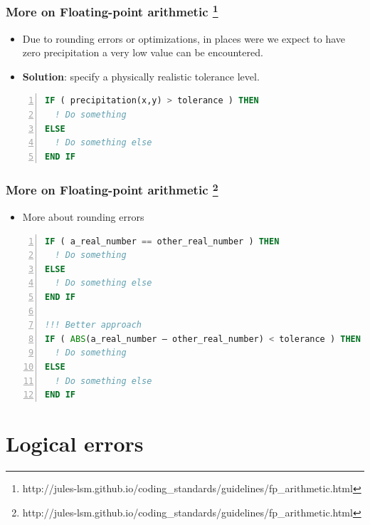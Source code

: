 \documentclass[t]{myBeamer}
\begin{document}
\begin{frame}[fragile,t]
\frametitle{ More on Floating-point arithmetic
\footnote{http://jules-lsm.github.io/coding\_standards/guidelines/fp\_arithmetic.html}}
\large

\begin{itemize}
  \item Due to rounding errors or optimizations, in places were we expect to have zero precipitation a very low value can be encountered. 
 \item \textbf{Solution}: specify a physically realistic tolerance level.
\end{itemize}

\begin{lstlisting}[language=fortran,numbers=left]
IF ( precipitation(x,y) > tolerance ) THEN
  ! Do something
ELSE
  ! Do something else
END IF
\end{lstlisting}

\end{frame}


\begin{frame}[fragile,t]
\frametitle{ More on Floating-point arithmetic
\footnote{http://jules-lsm.github.io/coding\_standards/guidelines/fp\_arithmetic.html}}
\large

\begin{itemize}
  \item More about rounding errors 
\end{itemize}

\begin{lstlisting}[language=fortran,numbers=left]
IF ( a_real_number == other_real_number ) THEN
  ! Do something
ELSE
  ! Do something else
END IF

!!! Better approach
IF ( ABS(a_real_number – other_real_number) < tolerance ) THEN
  ! Do something
ELSE
  ! Do something else
END IF
\end{lstlisting}

\end{frame}


\section{Logical errors} 
\end{document}
